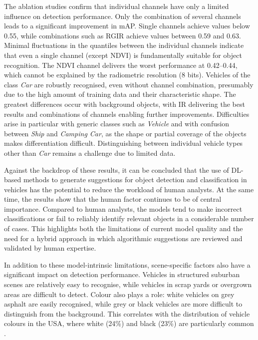 The ablation studies confirm that individual channels have only a limited influence on detection performance. Only the combination of several channels leads to a significant improvement in mAP. Single channels achieve values below 0.55, while combinations such as RGIR achieve values between 0.59 and 0.63. Minimal fluctuations in the quantiles between the individual channels indicate that even a single channel (except NDVI) is fundamentally suitable for object recognition. The NDVI channel delivers the worst performance at 0.42–0.44, which cannot be explained by the radiometric resolution (8 bits). Vehicles of the class \textit{Car} are robustly recognised, even without channel combination, presumably due to the high amount of training data and their characteristic shape. The greatest differences occur with background objects, with IR delivering the best results and combinations of channels enabling further improvements. Difficulties arise in particular with generic classes such as \textit{Vehicle} and with confusion between \textit{Ship} and \textit{Camping Car}, as the shape or partial coverage of the objects makes differentiation difficult. Distinguishing between individual vehicle types other than \textit{Car} remains a challenge due to limited data.

Against the backdrop of these results, it can be concluded that the use of \acrshort{DL}-based methods to generate suggestions for object detection and classification in vehicles has the potential to reduce the workload of human analysts. At the same time, the results show that the human factor continues to be of central importance. Compared to human analysts, the models tend to make incorrect classifications or fail to reliably identify relevant objects in a considerable number of cases. This highlights both the limitations of current model quality and the need for a hybrid approach in which algorithmic suggestions are reviewed and validated by human expertise.

In addition to these model-intrinsic limitations, scene-specific factors also have a significant impact on detection performance. Vehicles in structured suburban scenes are relatively easy to recognise, while vehicles in scrap yards or overgrown areas are difficult to detect. Colour also plays a role: white vehicles on grey asphalt are easily recognised, while grey or black vehicles are more difficult to distinguish from the background. This correlates with the distribution of vehicle colours in the USA, where white (24\%) and black (23\%) are particularly common \cite{abc_utah}.

